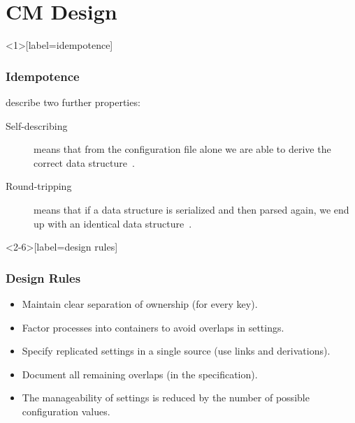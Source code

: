 \section{CM Design}

\begin{frame}<1>[label=idempotence]
	\frametitle{Idempotence}


\end{frame}

\begin{frame}
	\citet{wadler2003xml} describe two further properties:
	\vspace{2em}

	\begin{description}
	\item[Self-describing]
	means that from the configuration file alone we are able to derive the correct data structure~\cite{wadler2003xml}.

	\item[Round-tripping]
	means that if a data structure is serialized and then parsed again, we end up with an identical data structure~\cite{wadler2003xml}.
	\end{description}
\end{frame}

\begin{frame}<2-6>[label=design rules]
	\frametitle{Design Rules~\cite{burgess2006modeling}}

	\pause

	\begin{itemize}[<+-| alert@+>]
	\item Maintain clear separation of ownership (for every key).
	\item Factor processes into containers to avoid overlaps in settings.
	\item Specify replicated settings in a single source (use links and derivations).
	\item Document all remaining overlaps (in the specification).
	\item The manageability of settings is reduced by the number of possible configuration values.
	\end{itemize}
\end{frame}

